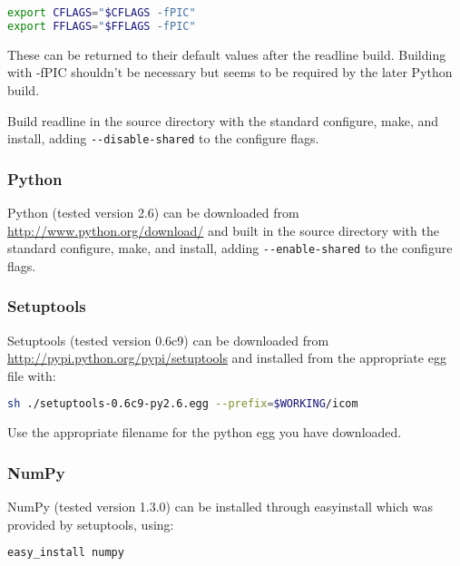 \begin{lstlisting}[language=bash]
export CFLAGS="$CFLAGS -fPIC"
export FFLAGS="$FFLAGS -fPIC"
\end{lstlisting}

These can be returned to their default values after the readline build.
Building with -fPIC shouldn't be necessary but seems to be required by the
later Python build.

Build readline in the source directory with the standard configure, make, and
install, adding \lstinline[language=bash]+--disable-shared+ to the configure
flags.


\subsubsection{Python}
\label{sect:required_libraries_python_python}

Python (tested version 2.6) can be downloaded from
\url{http://www.python.org/download/} and built in the source directory with
the standard configure, make, and install, adding
\lstinline[language=bash]+--enable-shared+ to the configure flags.

\subsubsection{Setuptools}
\label{sect:required_libraries_python_setuptools}

Setuptools (tested version 0.6c9) can be downloaded from
\url{http://pypi.python.org/pypi/setuptools} and installed from the appropriate
egg file with:

\begin{lstlisting}[language=bash]
sh ./setuptools-0.6c9-py2.6.egg --prefix=$WORKING/icom
\end{lstlisting}

Use the appropriate filename for the python egg you have downloaded.

\subsubsection{NumPy}
\label{sect:required_libraries_python_numpy}

NumPy (tested version 1.3.0) can be installed through
easy{\textunderscore}install which was provided by setuptools, using:

\begin{lstlisting}[language=bash]
easy_install numpy
\end{lstlisting}


